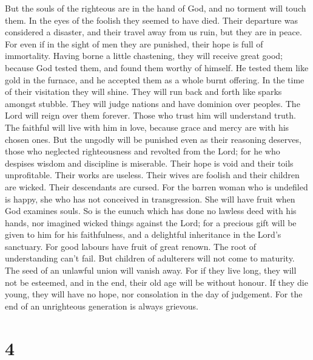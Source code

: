  But the souls of the righteous are in the hand of God, and
no torment will touch them.  In the eyes of the foolish they
seemed to have died. Their departure was considered a disaster,
 and their travel away from us ruin, but they are in peace.
 For even if in the sight of men they are punished, their
hope is full of immortality.  Having borne a little
chastening, they will receive great good; because God tested them, and
found them worthy of himself.  He tested them like gold in
the furnace, and he accepted them as a whole burnt offering.
 In the time of their visitation they will shine. They will
run back and forth like sparks amongst stubble.  They will
judge nations and have dominion over peoples. The Lord will reign over
them forever.  Those who trust him will understand truth.
The faithful will live with him in love, because grace and mercy are
with his chosen ones.  But the ungodly will be punished
even as their reasoning deserves, those who neglected righteousness and
revolted from the Lord;  for he who despises wisdom and
discipline is miserable. Their hope is void and their toils
unprofitable. Their works are useless.  Their wives are
foolish and their children are wicked.  Their descendants
are cursed. For the barren woman who is undefiled is happy, she who has
not conceived in transgression. She will have fruit when God examines
souls.  So is the eunuch which has done no lawless deed
with his hands, nor imagined wicked things against the Lord; for a
precious gift will be given to him for his faithfulness, and a
delightful inheritance in the Lord's sanctuary.  For good
labours have fruit of great renown. The root of understanding can't
fail.  But children of adulterers will not come to
maturity. The seed of an unlawful union will vanish away. 
For if they live long, they will not be esteemed, and in the end, their
old age will be without honour.  If they die young, they
will have no hope, nor consolation in the day of judgement.
 For the end of an unrighteous generation is always
grievous.

\hypertarget{section-3}{%
\section{4}\label{section-3}}

